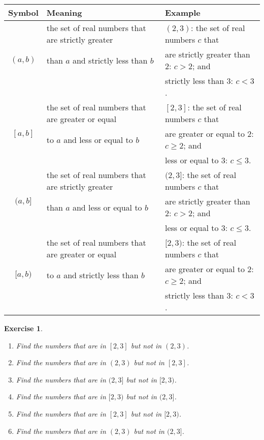 \documentclass[12pt]{article}
\newtheorem{ex}{Exercise}[section]
\begin{document}
\begin{table*}[h!]
\centering
\begin{tabular}{ c | l  | l}
Symbol & Meaning & Example \\
\hline
\multirow{3}{1.5em}{$(a, b)$} & the set of real numbers  that are  strictly greater & $(2,3)$: the set of real numbers $c$ that\\
											 & than $a$ and strictly less than $b$  & are strictly greater than $2$: $c>2$; and \\
											 & & strictly less than $3$: $c<3$.\\\hline
\multirow{3}{1.5em}{$[a, b]$} & the set of real numbers that are greater or equal & $[2,3]$: the set of real numbers $c$ that\\
											 & to $a$ and less or equal to $b$  & are greater or equal to $2$: $c\geq 2$; and \\
											 & & less or equal to $3$: $c\leq 3$.\\\hline
\multirow{3}{1.5em}{$(a,b]$} & the set of real numbers  that are strictly greater & $(2,3]$: the set of real numbers $c$ that\\
											 & than $a$ and less or equal to $b$  & are strictly greater than $2$: $c>2$; and\\
											 & & less or equal to $3$: $c\leq 3$.\\\hline
\multirow{3}{1.5em}{$[a,b)$} & the set of real numbers  that are greater or equal & $[2,3)$: the set of real numbers $c$ that\\
											 & to $a$ and strictly less than $b$  & are greater or equal to $2$: $c\geq 2$; and\\
											 & & strictly less than $3$: $c<3$.\\\hline
\end{tabular}
\end{table*}

\begin{ex}
\begin{enumerate}
\item[a)] Find the numbers that are in $[2,3]$ but not in $(2,3)$.
\item[b)] Find the numbers that are in $(2,3)$ but not in $[2,3]$.
\item[c)] Find the numbers that are in $(2,3]$ but not in $[2,3)$.
\item[d)] Find the numbers that are in $[2,3)$ but not in $(2,3]$.
\item[e)] Find the numbers that are in $[2,3]$ but not in $[2,3)$.
\item[f)] Find the numbers that are in $(2,3)$ but not in $(2,3]$.
\end{enumerate}
\end{ex}
\end{document}
